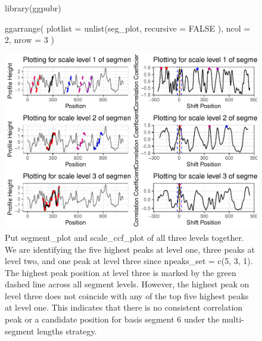 \begin{figure}
\vspace{1em}
\begin{adjustbox}{valign=t}
\begin{minipage}{.39\textwidth}

{\small {}
\begin{Schunk}
\begin{Sinput}
library(ggpubr)

ggarrange(
  plotlist =
    unlist(seg_plot,
      recursive = FALSE
    ),
  ncol = 2,
  nrow = 3
)
\end{Sinput}
\end{Schunk}
}
\vspace{1em}
\end{minipage}
\begin{minipage}{.59\textwidth}
\includegraphics[width=\textwidth]{ju-hofmann_files/figure-latex/segplot3-1.pdf}
\end{minipage}
\end{adjustbox}
\caption{\label{fig:segall} Put segment\_plot and scale\_ccf\_plot of all three levels together. We are identifying the five highest peaks at level one, three peaks at level two, and one peak at level three since npeaks\_set = c(5, 3, 1). The highest peak position at level three is marked by the green dashed line across all segment levels. However, the highest peak on level three does not coincide with any of the top five highest peaks at level one. This indicates that there is no consistent correlation peak or a candidate position for basis segment 6 under the multi-segment lengths strategy.}
\end{figure}

